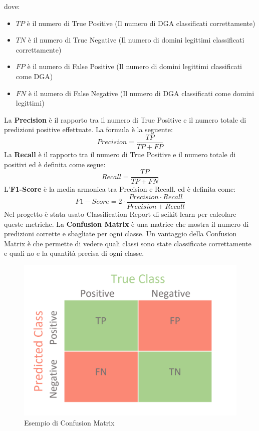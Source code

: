 \documentclass[12pt,a4paper,openright,twoside]{book}
\begin{document}
dove:
\begin{itemize}
    \item $TP$ è il numero di True Positive (Il numero di DGA classificati correttamente)
    \item $TN$ è il numero di True Negative (Il numero di domini legittimi classificati correttamente)
    \item $FP$ è il numero di False Positive (Il numero di domini legittimi classificati come DGA)
    \item $FN$ è il numero di False Negative (Il numero di DGA classificati come domini legittimi)
\end{itemize}

\noindent La \textbf{Precision} è il rapporto tra il numero di True Positive 
e il numero totale di predizioni positive effettuate.
La formula è la seguente:
\begin{equation}
    Precision = \frac{TP}{TP + FP}
\end{equation}
La \textbf{Recall} è il rapporto tra il numero di True Positive
e il numero totale di positivi ed è definita come segue:
\begin{equation}
    Recall = \frac{TP}{TP + FN}
\end{equation}
L'\textbf{F1-Score} è la media armonica tra Precision e Recall.
ed è definita come:
\begin{equation}
    F1-Score = 2 \cdot \frac{Precision \cdot Recall}{Precision + Recall}
\end{equation}
Nel progetto è stata usato Classification Report di scikit-learn
per calcolare queste metriche.
La \textbf{Confusion Matrix} è una matrice che mostra il numero di predizioni
corrette e sbagliate per ogni classe. Un vantaggio
della Confusion Matrix è che permette di vedere
quali classi sono state classificate correttamente e quali no e la quantità precisa di ogni classe.
\begin{figure}[H]
    \centering
    \includegraphics[width=0.6\linewidth]{figures/confusion-matrix.png}
    \caption{Esempio di Confusion Matrix \cite{confusion_matrix_image}}
    \label{fig:confusion matrix}
\end{figure}
\end{document}
